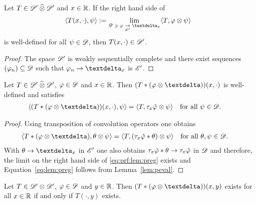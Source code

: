 \begin{lemma}
    \label{lem:peval}
    Let $ T \in \mathscr{  D  }' \mathbin{\widehat{\otimes}} \mathscr{  D  }' $ and $ x \in \mathbb{ R } $.
    If the right hand side of
    \begin{align}
        \ska{T(x,\cdot)}{\ps}
        :=
        \lim_{\text{$ \fsTest \ni \ph \underset{\fsDiscpt}{\to} \sfde{x} $}}
        \ska{T}{\ph\tepro\ps}
        \label{eq:lem:peval}
    \end{align}
    is well-defined for all $ \psi \in \mathscr{  D  } $,
    then $ T(x,\cdot) \in \mathscr{  D  }' $.
\end{lemma}

\begin{proof}
    The space $\mathscr{  D  }'$ is weakly sequentially complete
    and there exist sequences $ (\varphi_n) \subseteq \mathscr{  D  } $
    such that $ \ph_n \to \sfde{x} $ is $\mathscr{  E  }'$.
\end{proof}

\begin{lemma}
    \label{lem:preg}
    Let $ T \in \mathscr{  D  }' \mathbin{\widehat{\otimes}} \mathscr{  D  }' $, $ \varphi \in \mathscr{  D  } $ and $ x \in \mathbb{ R } $.
    Then $ ( T * ( \ph \tepro \sfdeo ) )(x,\cdot) $ is well-defined
    and satisfies
    \begin{align}
        \ska{ ( T * ( \ph \tepro \sfdeo ) )( x, \cdot ) }{ \ps }
        =
        \ska{ T }{ \ta_x\refl{\ph} \tepro \ps }
        &&&\text{for all $ \ps \in \fsTest $.}
        \label{eq:lem:preg}
    \end{align}
\end{lemma}

\begin{proof}
    Using transposition of convolution operators one obtains
    \begin{align}
        \ska{ T * ( \ph \tepro \sfdeo ) }{ \th \tepro \ps }
        =
        \ska{ T }{ ( \ta_x\refl{\ph} * \th ) \tepro \ps }
        &&&\text{for all $ \th,\ps \in \fsTest $.}
        \label{eq:prf:lem:preg}
    \end{align}
    With $ \th \to \sfde{x} $ in $\mathscr{  E  }'$ one also obtains
    $ \tau_x\check{ \varphi } * \theta \to \tau_x\check{ \varphi }$ in $\mathscr{  D  }$
    and therefore, the limit on the right hand side of \eqref{eq:prf:lem:preg}
    exists and Equation~\eqref{eq:lem:preg} follows from Lemma~\ref{lem:peval}.
\end{proof}

\begin{lemma}
    Let $ T \in \mathscr{  D  }' \otimes \mathscr{  D  }' $,
    $ \varphi \in \mathscr{  D  } $ and $ y \in \mathbb{ R } $.
    Then $ ( T * ( \ph \tepro \sfdeo ) )(x,y) $ exists for all $ x \in \mathbb{ R } $
    if and only if $ T(\cdot,y) $ exists.
\end{lemma}



